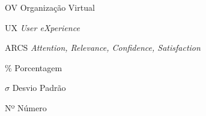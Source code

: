 \documentclass[
	12pt,				%
	openright,			%
	oneside,			
	a4paper,			%
	chapter=TITLE,		%
	section=TITLE,		%
	english,			%
	brazil,				%
	]{abntex2}
\begin{document}




\begin{comment}
\begin{siglas}
\end{comment}
\begin{siglas}
  \SingleSpacing
  \item[OV]       Organização Virtual
  \item[UX]       \textit{User eXperience}
  \item[ARCS]	  \textit{Attention, Relevance, Confidence, Satisfaction} 
\end{siglas}


%

\begin{simbolos}
	\SingleSpacing
	\item[\%] Porcentagem
	\item[$\sigma$] Desvio Padrão
	\item[Nº] Número 
\end{simbolos}


\tableofcontents*
\cleardoublepage

\textual

\pagestyle{eudesc}
\end{document}
